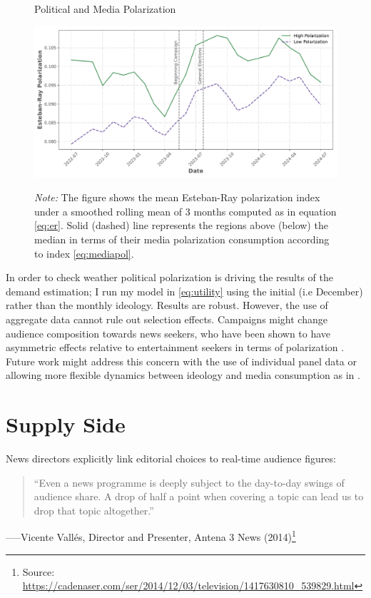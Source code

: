 \documentclass[12pt]{article}
\begin{document}
\begin{figure}[ht!]

	\centering
		\caption{Political and Media Polarization}
	\includegraphics[width=150mm]{figures/er_polarization_stata_group}
				\label{fig:er1}
	\caption*{\textit{Note:} \small The figure shows the mean Esteban-Ray polarization index under a smoothed rolling mean of 3 months computed as in equation \ref{eq:er}.  Solid (dashed) line represents the regions above (below) the median in terms of their media polarization consumption according to index \ref{eq:mediapol}.   }

\end{figure}

 In order to check weather political polarization is driving the results of the demand estimation; I run my model in \ref{eq:utility} using the initial (i.e December) rather than the monthly ideology. Results are robust.  However, the use of aggregate data cannot rule out selection effects. Campaigns might change audience composition towards news seekers, who have been shown to have asymmetric effects relative to entertainment seekers in terms of polarization \citep{levendusky,arceneaux_johnson_2013}. Future work might address this concern with the use of individual panel data or allowing more flexible dynamics between ideology and media consumption as in \cite{martin2017}.




\section{Supply Side}


\label{sec:supply}

News directors explicitly link editorial choices to real-time audience figures:

\begin{quote}
	“Even a news programme is deeply subject to the day-to-day swings of audience share.  
	A drop of half a point when covering a topic can lead us to drop that topic altogether.”
\end{quote}
\hspace*{\fill}\small–––Vicente Vallés, Director and Presenter, Antena 3 News (2014)\footnote{Source: \url{https://cadenaser.com/ser/2014/12/03/television/1417630810_539829.html}}
\end{document}

